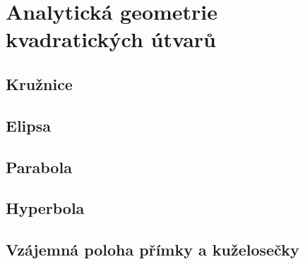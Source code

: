 
\newpage
    \section{Analytická geometrie kvadratických útvarů}
        \subsection{Kružnice}
        \subsection{Elipsa}
        \subsection{Parabola}
        \subsection{Hyperbola}
        \subsection{Vzájemná poloha přímky a kuželosečky}

